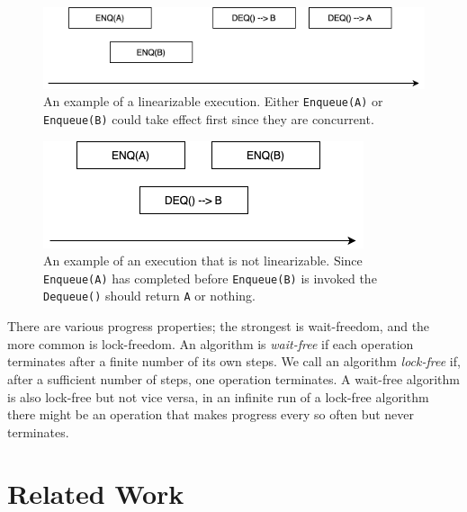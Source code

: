 \documentclass[12pt]{article}
\begin{document}
\begin{figure}[t]
  \center\includegraphics[scale=0.5]{pics/good}
  \caption{\label{fig::goodexample}An example of a linearizable execution. Either \texttt{Enqueue(A)} or \texttt{Enqueue(B)} could take effect first since they are concurrent.}
\end{figure}

\begin{figure}[t]
  \center\includegraphics[scale=0.5]{pics/bad}
  \caption{\label{fig::badexample}An example of an execution that is not linearizable. Since \texttt{Enqueue(A)} has completed before \texttt{Enqueue(B)} is invoked the \texttt{Dequeue()} should return \texttt{A} or nothing.}
\end{figure}


There are various progress properties; the strongest is wait-freedom, and the more common is lock-freedom. An algorithm is \textit{wait-free} if each operation terminates after a finite number of its own steps. We call an algorithm \textit{lock-free} if, after a sufficient number of steps, one operation terminates. A wait-free algorithm is also lock-free but not vice versa, in an infinite run of a lock-free algorithm there might be an operation that makes progress every so often but never terminates.


\section{Related Work}
\end{document}

